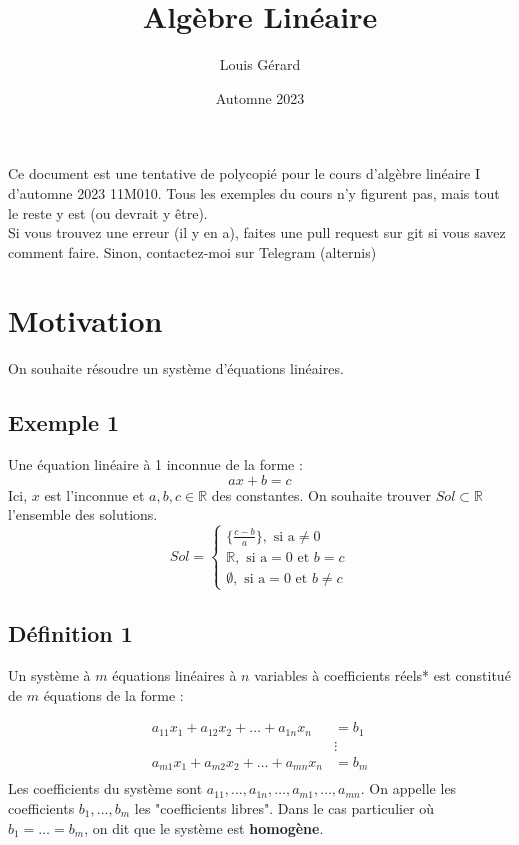 \documentclass[12pt]{article}
\title{Algèbre Linéaire}
\author{Louis Gérard}
\date{Automne 2023}
\begin{document}
\maketitle

\newcommand{\R}{\mathbb{R}}
\newcommand{\K}{\mathrm{K}}
\newcommand{\C}{\mathbb{C}}
\newcommand{\zero}{\mathbb{0}}
\newcommand{\family}{\{v_i\}_{i\in I}}
\newcommand{\uv}{\{u,v\}}

Ce document est une tentative de polycopié pour le cours d'algèbre 
linéaire I d'automne 2023 11M010. Tous les exemples du cours n'y figurent pas, mais tout le reste y est (ou devrait y être).
\\
Si vous trouvez une erreur (il y en a), faites une pull request sur git si vous savez comment faire. Sinon, contactez-moi sur Telegram (alternis) 
\pagebreak

\section*{Motivation}
On souhaite résoudre un système d'équations linéaires.
\subsection*{Exemple 1}
Une équation linéaire à 1 inconnue de la forme :
$$
ax+b=c
$$
Ici, $x$ est l'inconnue et $a,b,c \in \R$ des constantes. On souhaite trouver $Sol \subset \R$
l'ensemble des solutions.
$$
Sol = \begin{cases} \{\frac{c-b}{a}\}, \text{ si a} \neq 0 \\
     \R, \text{ si a}=0 \text{ et } b = c \\ 
    \emptyset, \text{ si a}=0 \text{ et } b \neq c
    \end{cases}
$$
\subsection*{Définition 1}
Un système à $m$ équations linéaires à $n$ variables à 
coefficients réels* est constitué de $m$ équations de la forme :

$$
\begin{aligned}
    a_{11}x_1 + a_{12}x_2 + \dots + a_{1n}x_n &=b_1 \\
    & \vdots \\
    a_{m1}x_1 + a_{m2}x_2 + \dots + a_{mn}x_n &=b_m \\
\end{aligned}
$$
Les coefficients du système sont $a_{11}, \dots, a_{1n}, \dots, a_{m1}, \dots, a_{mn}$.
On appelle les coefficients $b_1, \dots, b_m$ les "coefficients libres".
Dans le cas particulier où $b_1 = \dots = b_m$, on dit que le système est \textbf{homogène}.
\end{document}
